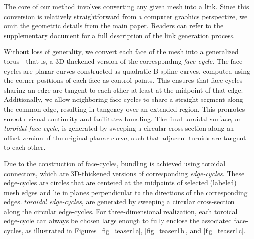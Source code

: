 \documentclass[times,twocolumn,final]{elsarticle}
\newcommand{\ergun}[1]{{\color{red} #1}}
\begin{document}
The core of our method involves converting any given mesh into a link. Since this conversion is relatively straightforward from a computer graphics perspective, we omit the geometric details from the main paper. Readers can refer to the supplementary document for a full description of the link generation process.

Without loss of generality, we convert each face of the mesh into \ergun{a generalized torus—that is, a 3D-thickened version of the corresponding \textit{face-cycle}. The face-cycles are planar curves constructed as quadratic B-spline curves, computed using the corner positions of each face as control points. This ensures} that face-cycles sharing an edge are tangent to each other at least at the midpoint of that edge. Additionally, we allow neighboring face-cycles to share a straight segment along the common edge, resulting in tangency over an extended region. This promotes smooth visual continuity and facilitates bundling. \ergun{The final toroidal surface, or \textit{toroidal face-cycle}, is generated by sweeping a circular cross-section along an offset version of the original planar curve, such that adjacent toroids are tangent to each other.}

Due to the construction of face-cycles, bundling is achieved using \ergun{toroidal connectors, which are 3D-thickened versions of corresponding \textit{edge-cycles}. 
These edge-cycles are circles that are centered at the midpoints of selected (labeled) mesh edges and lie in planes perpendicular to the directions of the corresponding edges.
\textit{toroidal edge-cycles}, are generated by sweeping a circular cross-section along the circular edge-cycles.}
For three-dimensional realization, each \ergun{toroidal} edge-cycle can always be chosen large enough to fully enclose the associated face-cycles, as illustrated in Figures~\ref{fig_teaser1a}, \ref{fig_teaser1b}, and \ref{fig_teaser1c}.
\end{document}

